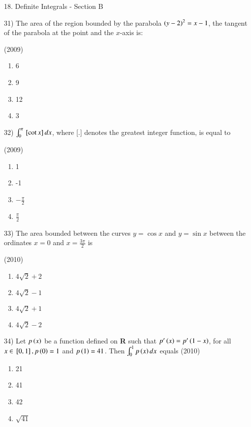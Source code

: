 \documentclass[journal,12pt,twocolumn]{IEEEtran}
\theoremstyle{remark}
\begin{document}
18. Definite Integrals - Section B

31)
	 The area of the region bounded by the parabola $\left(y-2\right)^2=x-1$, the tangent of the parabola at the point  and the $x$-axis is:

		\hfill{(2009)}

		\begin{multicols}{4}
			\begin{enumerate}
				\item 6
				\item 9
				\item 12
				\item 3
			\end{enumerate}
		\end{multicols}

32)
	 $\int_0^\pi{}\left[\cot x\right]dx$, where [.] denotes the greatest integer function, is equal to

		\hfill{(2009)}

		\begin{multicols}{4}
			\begin{enumerate}
				\item 1
				\item -1
				\item $-\frac{\pi}{2}$
				\item $\frac{\pi}{2}$
			\end{enumerate}
		\end{multicols}

33)
	 The area bounded between the curves $y=\cos x$ and $y=\sin x$ between the ordinates $x=0$ and $x=\frac{3\pi}{2}$ is

		\hfill{(2010)}

		\begin{multicols}{2}
			\begin{enumerate}
				\item $4\sqrt{2}+2$
				\item $4\sqrt{2}-1$
				\item $4\sqrt{2}+1$
				\item $4\sqrt{2}-2$
			\end{enumerate}
		\end{multicols}

34)
	 Let $p\left(x\right)$ be a function defined on \textbf{R} such that $p'\left(x\right)=p'\left(1-x\right)$, for all $x\in{}\left[0,1\right],p\left(0\right)=1$ and $p\left(1\right)=41$. Then $\int_0^1p\left(x\right)dx$ equals
		\hfill{(2010)}

		\begin{multicols}{4}
			\begin{enumerate}
				\item 21
				\item 41
				\item 42
				\item $\sqrt{41}$
			\end{enumerate}
		\end{multicols}
\end{document}
